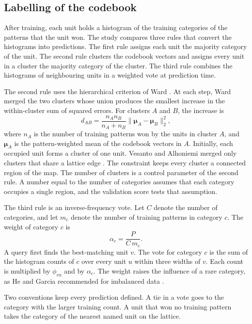 \documentclass[conference,10pt]{IEEEtran}
\begin{document}
\subsection{Labelling of the codebook}
After training, each unit holds a histogram of the training categories of the patterns that the unit won.
The study compares three rules that convert the histograms into predictions.
The first rule assigns each unit the majority category of the unit.
The second rule clusters the codebook vectors and assigns every unit in a cluster the majority category of the cluster.
The third rule combines the histograms of neighbouring units in a weighted vote at prediction time.

The second rule uses the hierarchical criterion of Ward \cite{ward1963}.
At each step, Ward merged the two clusters whose union produces the smallest increase in the within-cluster sum of squared errors.
For clusters $A$ and $B$, the increase is
\begin{equation}
d_{AB}=\frac{n_A n_B}{n_A+n_B}\lVert\boldsymbol{\mu}_A-\boldsymbol{\mu}_B\rVert_2^2,
\label{eq:ward}
\end{equation}
where $n_A$ is the number of training patterns won by the units in cluster $A$, and $\boldsymbol{\mu}_A$ is the pattern-weighted mean of the codebook vectors in $A$.
Initially, each occupied unit forms a cluster of one unit.
Vesanto and Alhoniemi merged only clusters that share a lattice edge \cite{vesanto2000}.
The constraint keeps every cluster a connected region of the map.
The number of clusters is a control parameter of the second rule.
A number equal to the number of categories assumes that each category occupies a single region, and the validation score tests that assumption.

The third rule is an inverse-frequency vote.
Let $C$ denote the number of categories, and let $m_c$ denote the number of training patterns in category $c$.
The weight of category $c$ is
\begin{equation}
\alpha_c=\frac{P}{C\,m_c}.
\label{eq:weight}
\end{equation}
A query first finds the best-matching unit $v$.
The vote for category $c$ is the sum of the histogram counts of $c$ over every unit $u$ within three widths of $v$.
Each count is multiplied by $\phi_{vu}$ and by $\alpha_c$.
The weight raises the influence of a rare category, as He and Garcia recommended for imbalanced data \cite{he2009}.

Two conventions keep every prediction defined.
A tie in a vote goes to the category with the larger training count.
A unit that won no training pattern takes the category of the nearest named unit on the lattice.
\end{document}

